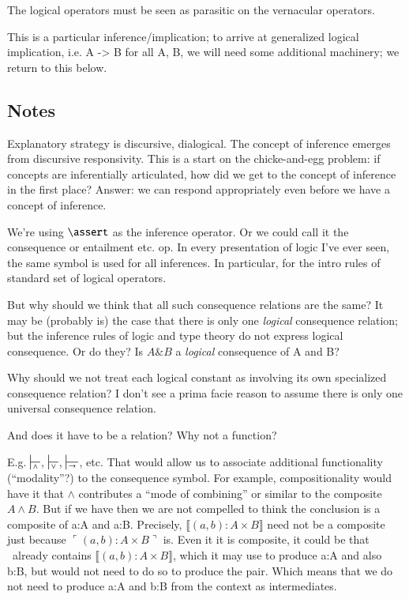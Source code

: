 The logical operators must be seen as parasitic on the vernacular
operators.

This is a particular inference/implication; to arrive at
generalized logical implication, i.e. A -> B for all A, B, we will need some additional machinery; we return to this below.


\subsection{Notes}

Explanatory strategy is discursive, dialogical. The concept of
inference emerges from discursive responsivity. This is a start on the
chicke-and-egg problem: if concepts are inferentially articulated, how
did we get to the concept of inference in the first place? Answer: we
can respond appropriately even before we have a concept of inference.


We're using \(\linfer\) as the inference operator. Or we could call it
the consequence or entailment etc. op. In every presentation of logic
I've ever seen, the same symbol is used for all inferences. In
particular, for the intro rules of standard set of logical operators.

But why should we think that all such consequence relations are the
same? It may be (probably is) the case that there is only one
\textit{logical} consequence relation; but the inference rules of
logic and type theory do not express logical consequence. Or do
they? Is \(A\&B\) a \textit{logical} consequence of A and B?

Why should we not treat each logical constant as involving its own
specialized consequence relation?  I don't see a prima facie reason to
assume there is only one universal consequence relation.

And does it have to be a relation? Why not a function?

E.g. \(\sststile{\land}{}\), \(\sststile{\lor}{}\),
\(\sststile{\rightarrow}{}\), etc. That would allow us to associate
additional functionality (``modality''?) to the consequence symbol.
For example, compositionality would have it that \(\land\) contributes
a ``mode of combining'' or similar to the composite \(A\land B\). But
if we have
then we are not compelled to think the
conclusion is a composite of a:A and a:B. Precisely, \(\llbracket
(a,b): A\times B\rrbracket\) need not be a composite just because
\(\ulcorner (a,b): A\times B\urcorner\) is. Even it it is composite,
it could be that \ContextG\ already contains \(\llbracket (a,b):
A\times B\rrbracket\), which it may use to produce a:A and also b:B,
but would not need to do so to produce the pair. Which means that we
do not need to produce a:A and b:B from the context as intermediates.

